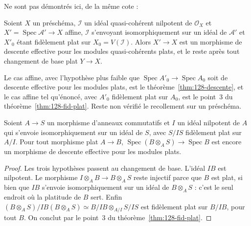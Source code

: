 Ne sont pas démontrés ici, de la même cote :

\begin{encadre}
\begin{theoreme*}\nonverifie
Soient $X$ un préschéma, $\mathcal I$ un idéal quasi-cohérent nilpotent de $\mathcal O_X$ et $X' = \operatorname{Spec} \mathcal A' \to X$ affine, $\mathcal I$ s'envoyant isomorphiquement sur un idéal de $\mathcal A'$ et $X'_0$ étant fidèlement plat sur $X_0 = V(\mathcal I)$. Alors $X' \to X$ est un morphisme de descente effective pour les modules quasi-cohérents plats, et le reste après tout changement de base plat $Y \to X$.
\end{theoreme*}
\end{encadre}
{\small Le cas affine, avec l'hypothèse plus faible que $\operatorname{Spec} A'_0 \to \operatorname{Spec} A_0$ soit de descente effective pour les modules plats, est le théorème~\ref{thm:128-descente}, et le cas affine tel qu'énoncé, avec $A'_0$ fidèlement plat sur $A_0$, est le point~3 du théorème~\ref{thm:128-fid-plat}. Reste non vérifié le recollement sur un préschéma.\par}

\begin{encadre}
\begin{theoreme}
Soient $A \to S$ un morphisme d'anneaux commutatifs et $I$ un idéal nilpotent de $A$ qui s'envoie isomorphiquement sur un idéal de $S$, avec $S/IS$ fidèlement plat sur $A/I$. Pour tout morphisme plat $A \to B$, $\operatorname{Spec}(B \otimes_A S) \to \operatorname{Spec} B$ est encore un morphisme de descente effective pour les modules plats.
\end{theoreme}
\end{encadre}

\begin{proof}
Les trois hypothèses passent au changement de base. L'idéal $IB$ est nilpotent. Le morphisme $I \otimes_A B \to B \otimes_A S$ reste injectif parce que $B$ est plat, si bien que $IB$ s'envoie isomorphiquement sur un idéal de $B \otimes_A S$ : c'est le seul endroit où la platitude de $B$ sert. Enfin $(B \otimes_A S)/IB(B \otimes_A S) \simeq B/IB \otimes_{A/I} S/IS$ est fidèlement plat sur $B/IB$, pour tout $B$. On conclut par le point~3 du théorème~\ref{thm:128-fid-plat}.
\end{proof}

